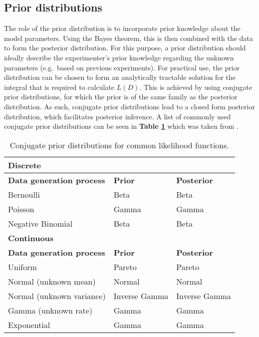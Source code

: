\newpage

\subsection{Prior distributions}
\label{sec0:prior}

The role of the prior distribution is to incorporate prior knowledge about the model parameters. Using the Bayes theorem, this is then combined with the data to form the posterior distribution. For this purpose, a prior distribution should ideally describe the experimenter's prior knowledge regarding the unknown parameters (e.g.~based on previous experiments). For practical use, the prior distribution can be chosen to form an analytically tractable solution for the integral that is required to calculate $L(D)$. This is achieved by using conjugate prior distributions, for which the prior is of the same family as the posterior distribution. As such, conjugate prior distributions lead to a closed form posterior distribution, which facilitates posterior inference. A list of commonly used conjugate prior distributions can be seen in \textbf{Table \ref{tab0:priors}} which was taken from \citep{Fink1997}.

\begin{table}[hb	]
\centering
\caption[Conjugate prior distributions for common likelihood functions]{Conjugate prior distributions for common likelihood functions.}
\label{tab0:priors}
\begin{tabular}{l l l}
\toprule
\textbf{Discrete} & &\\
\midrule
\midrule
\textbf{Data generation process} & \textbf{Prior} & \textbf{Posterior} \\ 
\midrule 
Bernoulli & Beta & Beta \\
Poisson & Gamma  & Gamma \\
Negative Binomial & Beta & Beta \\
\midrule
\midrule
\textbf{Continuous} & & \\
\midrule
\midrule
\textbf{Data generation process} & \textbf{Prior} & \textbf{Posterior} \\ 
\midrule
Uniform  & Pareto & Pareto \\ 
Normal (unknown mean) &  Normal  & Normal \\ 
Normal (unknown variance) &  Inverse Gamma  & Inverse Gamma \\ 
Gamma (unknown rate) &  Gamma  & Gamma \\ 
Exponential &  Gamma  & Gamma \\ 
\bottomrule
\end{tabular}
\end{table} 

